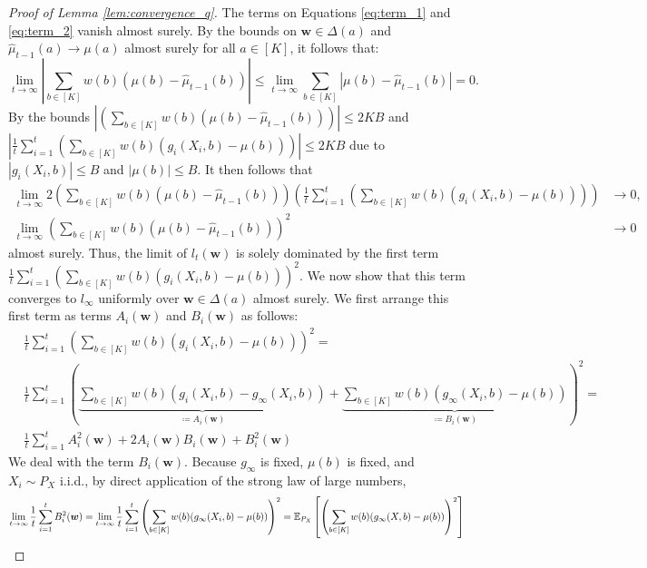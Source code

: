 \documentclass{article}
\begin{document}
\begin{appendices}
\begin{proof}[Proof of Lemma \ref{lem:convergence_q}]
The terms on Equations \eqref{eq:term_1} and \eqref{eq:term_2} vanish almost surely. By the bounds on $\bm{w} \in \Delta(a)$ and $\hat\mu_{t-1}(a) \rightarrow \mu(a)$ almost surely for all $a \in [K]$, it follows that:
\begin{equation}
    \lim_{t \rightarrow \infty}\left|\sum_{b \in [K]} w(b)(\mu(b) - \hat\mu_{t-1}(b))\right| \leq \lim_{t \rightarrow \infty}\sum_{b \in [K]} |\mu(b) - \hat\mu_{t-1}(b)| = 0.
\end{equation}
By the bounds $\left|\left(\sum_{b \in [K]} w(b)(\mu(b) - \hat\mu_{t-1}(b)) \right)\right| \leq 2KB$ and $\left|\frac{1}{t}\sum_{i=1}^t \left(\sum_{b \in [K]} w(b) (g_i(X_i,b) - \mu(b)) \right)\right| \leq 2KB$ due to $|g_i(X_i, b)| \leq B$ and $|\mu(b)| \leq B $. It then follows that
\begin{align}
    \lim_{t \rightarrow \infty}2\left(\sum_{b \in [K]}w(b) (\mu(b) - \hat\mu_{t-1}(b)) \right)\left(\frac{1}{t}\sum_{i=1}^t \left(\sum_{b \in [K]} w(b) (g_i(X_i,b) - \mu(b)) \right)\right) &\rightarrow 0,\\
    \lim_{t \rightarrow \infty}\left(\sum_{b \in [K]} w(b)(\mu(b) - \hat\mu_{t-1}(b)) \right)^2 &\rightarrow 0
\end{align}
almost surely. Thus, the limit of $l_t(\bm{w})$ is solely dominated by the first term $\frac{1}{t}\sum_{i=1}^t\left(\sum_{b \in [K]} w(b)\left( g_i(X_i,b) - \mu(b)\right)\right)^2$. We now show that this term converges to $l_\infty$ uniformly over $\bm{w} \in \Delta(a)$ almost surely. We first arrange this first term as terms $A_i(\bm{w})$ and $B_i(\bm{w})$ as follows:
\begin{align}
    &\frac{1}{t}\sum_{i=1}^t\left(\sum_{b \in [K]} w(b)\left( g_i(X_i,b) - \mu(b)\right)\right)^2 = \\
    &\frac{1}{t}\sum_{i=1}^t \left( \underbrace{\sum_{b \in [K]} w(b)(g_i(X_i,b) - g_\infty(X_i, b))}_{\coloneqq A_i(\bm{w})} + \underbrace{\sum_{b \in [K]} w(b)(g_\infty(X_i, b) - \mu(b))}_{\coloneqq B_i(\bm{w})} \right)^2=\\
    &\frac{1}{t}\sum_{i=1}^t A_i^2(\bm{w}) + 2A_i(\bm{w})B_i(\bm{w}) + B_i^2(\bm{w})
\end{align}
We deal with the term $B_i(\bm{w})$. Because $g_\infty$ is fixed, $\mu(b)$ is fixed, and $X_i \sim P_X$ i.i.d., by direct application of the strong law of large numbers, 
\begin{equation}
    \lim_{t \rightarrow \infty}\frac{1}{t}\sum_{i=1}^t B_i^2(\bm{w}) = \lim_{t \rightarrow \infty}\frac{1}{t}\sum_{i=1}^t \left( \sum_{b \in [K]} w(b)(g_\infty(X_i, b) - \mu(b))\right)^2  =  \EE_{P_X}\left[ \left(\sum_{b\in [K]} w(b) (g_\infty(X,b) - \mu(b))\right)^2  \right]

\end{equation}
\end{proof}
\end{appendices}
\end{document}
